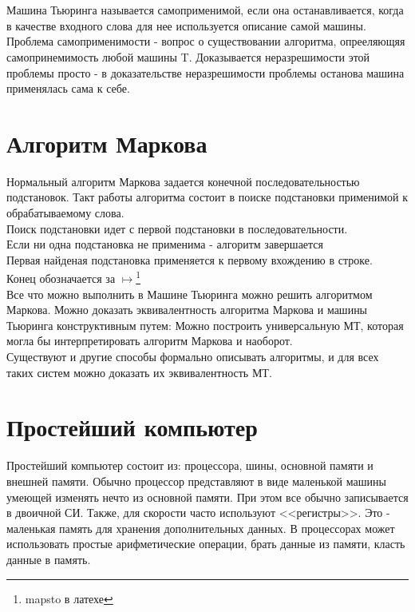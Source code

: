 \documentclass[a4paper,12pt]{article}
\author{конспект от TheLostDesu}
\title{}
\date{\today}
\begin{document}
\maketitle
\section{}
Машина Тьюринга называется самоприменимой, если она останавливается, когда в качестве входного слова для нее используется описание самой машины. Проблема самоприменимости - вопрос о существовании алгоритма, опрееляющяя самопринемимость любой машины T. Доказывается неразрешимости этой проблемы просто - в доказательстве неразрешимости проблемы останова машина применялась сама к себе. 
\section{Алгоритм Маркова}
Нормальный алгоритм Маркова задается конечной последовательностью подстановок. Такт работы алгоритма состоит в поиске подстановки применимой к обрабатываемому слова.\\
Поиск подстановки идет с первой подстановки в последовательности.\\
Если ни одна подстановка не применима - алгоритм завершается \\
Первая найденая подстановка применяется к первому вхождению в строке.\\
Конец обозначается за $\mapsto$\footnote{mapsto в латехе}\\
Все что можно выполнить в Машине Тьюринга можно решить алгоритмом Маркова.
Можно доказать эквивалентность алгоритма Маркова и машины Тьюринга конструктивным путем: Можно построить универсальную МТ, которая могла бы интерпретировать алгоритм Маркова и наоборот. \\
Существуют и другие способы формально описывать алгоритмы, и для всех таких систем можно доказать их эквивалентность МТ.
\section{Простейший компьютер}
Простейший компьютер состоит из: процессора, шины, основной памяти и внешней памяти. Обычно процессор представляют в виде маленькой машины умеющей изменять нечто из основной памяти. При этом все обычно записывается в двоичной СИ. Также, для скорости часто используют <<регистры>>. Это - маленькая память для хранения дополнительных данных. В процессорах может использовать простые арифметические операции, брать данные из памяти, класть данные в память.
\end{document}
